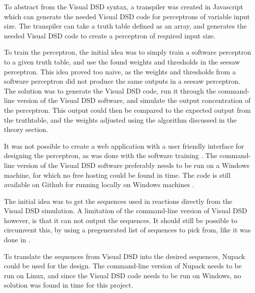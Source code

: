 To abstract from the Visual DSD syntax, a transpiler was created in Javascript which can generate the needed Visual DSD code for perceptrons of variable input size. The transpiler can take a truth table defined as an array, and generates the needed Visual DSD code to create a perceptron of required input size.

To train the perceptron, the initial idea was to simply train a software perceptron to a given truth table, and use the found weights and thresholds in the seesaw perceptron. This idea proved too naive, as the weights and thresholds from a software perceptron did not produce the same outputs in a seesaw perceptron. The solution was to generate the Visual DSD code, run it through the command-line version of the Visual DSD software, and simulate the output concentration of the perceptron. This output could then be compared to the expected output from the truthtable, and the weights adjusted using the algorithm discussed in the theory section.

It was not possible to create a web application with a user friendly interface for designing the perceptron, as was done with the software training \cite{neuralcircuit}. The command-line version of the Visual DSD software preferably needs to be run on a Windows machine, for which no free hosting could be found in time. The code is still available on Github for running locally on Windows machines \cite{neuralcompiler}.

The initial idea was to get the sequences used in reactions directly from the Visual DSD simulation. A limitation of the command-line version of Visual DSD however, is that it can not output the sequences. It should still be possible to circumvent this, by using a pregenerated list of sequences to pick from, like it was done in \cite{Thubagere2017}.

To translate the sequences from Visual DSD into the desired sequences, Nupack could be used for the design. The command-line version of Nupack needs to be run on Linux, and since the Visual DSD code needs to be run on Windows, no solution was found in time for this project.

